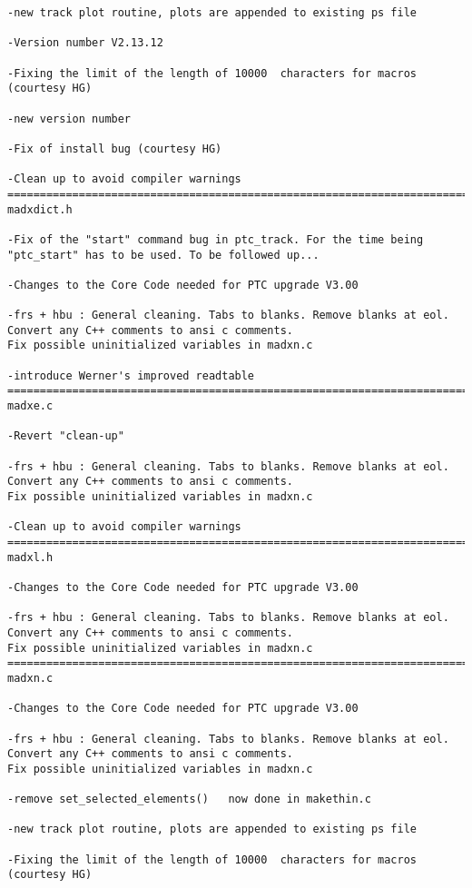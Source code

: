 \begin{verbatim}
-new track plot routine, plots are appended to existing ps file

-Version number V2.13.12

-Fixing the limit of the length of 10000  characters for macros (courtesy HG)

-new version number

-Fix of install bug (courtesy HG)

-Clean up to avoid compiler warnings
=============================================================================
madxdict.h

-Fix of the "start" command bug in ptc_track. For the time being
"ptc_start" has to be used. To be followed up...

-Changes to the Core Code needed for PTC upgrade V3.00

-frs + hbu : General cleaning. Tabs to blanks. Remove blanks at eol.
Convert any C++ comments to ansi c comments.
Fix possible uninitialized variables in madxn.c

-introduce Werner's improved readtable
=============================================================================
madxe.c

-Revert "clean-up"

-frs + hbu : General cleaning. Tabs to blanks. Remove blanks at eol.
Convert any C++ comments to ansi c comments.
Fix possible uninitialized variables in madxn.c

-Clean up to avoid compiler warnings
=============================================================================
madxl.h

-Changes to the Core Code needed for PTC upgrade V3.00

-frs + hbu : General cleaning. Tabs to blanks. Remove blanks at eol.
Convert any C++ comments to ansi c comments.
Fix possible uninitialized variables in madxn.c
=============================================================================
madxn.c

-Changes to the Core Code needed for PTC upgrade V3.00

-frs + hbu : General cleaning. Tabs to blanks. Remove blanks at eol.
Convert any C++ comments to ansi c comments.
Fix possible uninitialized variables in madxn.c

-remove set_selected_elements()   now done in makethin.c

-new track plot routine, plots are appended to existing ps file

-Fixing the limit of the length of 10000  characters for macros (courtesy HG)


\end{verbatim}
